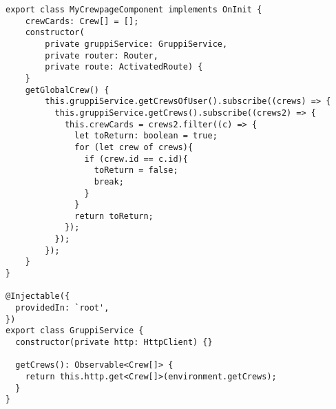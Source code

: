 \begin{lstlisting}[style=Java, caption = {Esempio implementazione \textit{pattern Observer}}]
export class MyCrewpageComponent implements OnInit {
    crewCards: Crew[] = [];
    constructor(
        private gruppiService: GruppiService,
        private router: Router,
        private route: ActivatedRoute) {
    }
    getGlobalCrew() {
        this.gruppiService.getCrewsOfUser().subscribe((crews) => {
          this.gruppiService.getCrews().subscribe((crews2) => {
            this.crewCards = crews2.filter((c) => {
              let toReturn: boolean = true;
              for (let crew of crews){
                if (crew.id == c.id){
                  toReturn = false;
                  break;
                }
              }
              return toReturn;
            });
          });
        });
    }
}

@Injectable({
  providedIn: `root',
})
export class GruppiService {
  constructor(private http: HttpClient) {}

  getCrews(): Observable<Crew[]> {
    return this.http.get<Crew[]>(environment.getCrews);
  }
}
\end{lstlisting}
